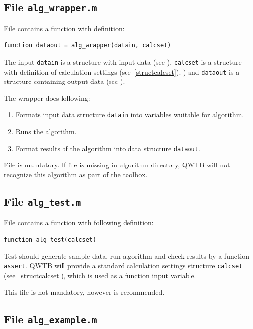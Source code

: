 \documentclass[12pt,a4paper,oneside]{report} %
\begin{document}
\subsection{File {\tt alg\_wrapper.m}} %
\label{filealgwrapper}
File contains a function with definition:

\begin{lstlisting}
function dataout = alg_wrapper(datain, calcset)
\end{lstlisting}

The input \lstinline{datain} is a structure with input data (see %
), \lstinline{calcset} is a structure with definition of calculation settings
(see~\ref{structcalcset}).
) and \lstinline{dataout} is a structure containing output data (see %
).

The wrapper does following:
\begin{enumerate}
        \item Formats input data structure \lstinline{datain} into variables wuitable for algorithm.
        \item Runs the algorithm.
        \item Format results of the algorithm into data structure \lstinline{dataout}.
\end{enumerate}

File is mandatory. If file is missing in algorithm directory, QWTB will not recognize this
algorithm as part of the toolbox.

\subsection{File {\tt alg\_test.m}} %
\label{filealgtest}
File contains a function with following definition:

\begin{lstlisting}
function alg_test(calcset)
\end{lstlisting}

Test should generate sample data, run algorithm and check results by a function \lstinline{assert}.
QWTB will provide a standard calculation settings structure \lstinline{calcset}
(see~\ref{structcalcset}), which is used as a function input variable.

This file is not mandatory, however is recommended.

\subsection{File {\tt alg\_example.m}} %
\label{filealgexample}
\end{document}
